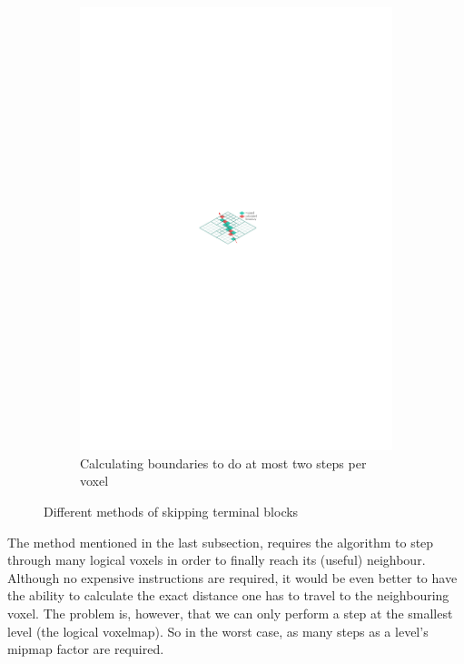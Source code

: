 \begin{figure}[ht]
\begin{subfigure}{.33\textwidth}
  \includegraphics[scale=1]{figures/emptyspace_skip2.pdf}
  \caption{Calculating boundaries to do \newline  at most two steps per voxel}
  \label{fig:emtpyspace3}
\end{subfigure}
\caption{Different methods of skipping terminal blocks}
\label{fig:emptyspace}
\end{figure}
The method mentioned in the last subsection, requires the algorithm to step through many logical voxels in order to finally reach its (useful) neighbour. Although no expensive instructions are required, it would be even better to have the ability to calculate the exact distance one has to travel to the neighbouring voxel. The problem is, however, that we can only perform a step at the smallest level (the logical voxelmap). So in the worst case, as many steps as a level's mipmap factor are required. 


